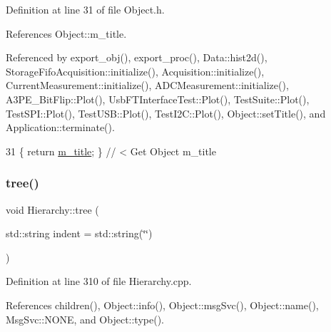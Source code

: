 Definition at line 31 of file Object.\+h.



References Object\+::m\+\_\+title.



Referenced by export\+\_\+obj(), export\+\_\+proc(), Data\+::hist2d(), Storage\+Fifo\+Acquisition\+::initialize(), Acquisition\+::initialize(), Current\+Measurement\+::initialize(), A\+D\+C\+Measurement\+::initialize(), A3\+P\+E\+\_\+\+Bit\+Flip\+::\+Plot(), Usb\+F\+T\+Interface\+Test\+::\+Plot(), Test\+Suite\+::\+Plot(), Test\+S\+P\+I\+::\+Plot(), Test\+U\+S\+B\+::\+Plot(), Test\+I2\+C\+::\+Plot(), Object\+::set\+Title(), and Application\+::terminate().


\begin{DoxyCode}
31 \{ \textcolor{keywordflow}{return} \hyperlink{classObject_affbeea1953eb5163573b92fad8f75727}{m\_title};      \} \textcolor{comment}{// < Get Object m\_title}
\end{DoxyCode}
\mbox{\label{classHierarchy_a76e914b9a677a22a82deb74d892bf261}} 
\subsubsection{\texorpdfstring{tree()}{tree()}\hspace{0.1cm}{\footnotesize\ttfamily [1/2]}}
{\footnotesize\ttfamily void Hierarchy\+::tree (\begin{DoxyParamCaption}\item[{std\+::string}]{indent = {\ttfamily std\+:\+:string(\char`\"{}\char`\"{})} }\end{DoxyParamCaption})}



Definition at line 310 of file Hierarchy.\+cpp.



References children(), Object\+::info(), Object\+::msg\+Svc(), Object\+::name(), Msg\+Svc\+::\+N\+O\+NE, and Object\+::type().


